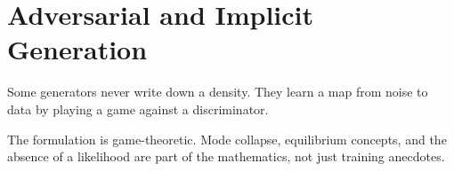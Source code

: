 \chapter{Adversarial and Implicit Generation}
\label{ch:adversarial}

Some generators never write down a density. They learn a map from noise to data by playing a game against a discriminator.

The formulation is game-theoretic. Mode collapse, equilibrium concepts, and the absence of a likelihood are part of the mathematics, not just training anecdotes.
